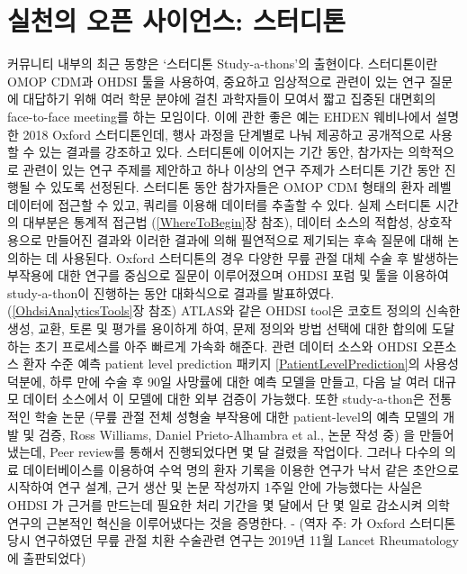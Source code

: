 \documentclass[10.5pt]{book}
\theoremstyle{definition}
\theoremstyle{definition}
\theoremstyle{definition}
\theoremstyle{remark}
\begin{document}
\section{실천의 오픈 사이언스: 스터디톤}\label{---}


커뮤니티 내부의 최근 동향은 `스터디톤 Study-a-thons'의 출현이다.
스터디톤이란 OMOP CDM과 OHDSI 툴을 사용하여, 중요하고 임상적으로 관련이
있는 연구 질문에 대답하기 위해 여러 학문 분야에 걸친 과학자들이 모여서
짧고 집중된 대면회의 face-to-face meeting를 하는 모임이다. 이에 관한
좋은 예는 EHDEN 웨비나에서 설명한 2018 Oxford 스터디톤인데, 행사 과정을
단계별로 나눠 제공하고 공개적으로 사용할 수 있는 결과를 강조하고 있다.
스터디톤에 이어지는 기간 동안, 참가자는 의학적으로 관련이 있는 연구
주제를 제안하고 하나 이상의 연구 주제가 스터디톤 기간 동안 진행될 수
있도록 선정된다. 스터디톤 동안 참가자들은 OMOP CDM 형태의 환자 레벨
데이터에 접근할 수 있고, 쿼리를 이용해 데이터를 추출할 수 있다. 실제
스터디톤 시간의 대부분은 통계적 접근법 (\ref{WhereToBegin}장 참조),
데이터 소스의 적합성, 상호작용으로 만들어진 결과와 이러한 결과에 의해
필연적으로 제기되는 후속 질문에 대해 논의하는 데 사용된다. Oxford
스터디톤의 경우 다양한 무릎 관절 대체 수술 후 발생하는 부작용에 대한
연구를 중심으로 질문이 이루어졌으며 OHDSI 포럼 및 툴을 이용하여
study-a-thon이 진행하는 동안 대화식으로 결과를 발표하였다.
(\ref{OhdsiAnalyticsTools}장 참조) ATLAS와 같은 OHDSI tool은 코호트
정의의 신속한 생성, 교환, 토론 및 평가를 용이하게 하여, 문제 정의와 방법
선택에 대한 합의에 도달하는 초기 프로세스를 아주 빠르게 가속화 해준다.
관련 데이터 소스와 OHDSI 오픈소스 환자 수준 예측 patient level
prediction 패키지 \ref{PatientLevelPrediction}의 사용성 덕분에, 하루
만에 수술 후 90일 사망률에 대한 예측 모델을 만들고, 다음 날 여러 대규모
데이터 소스에서 이 모델에 대한 외부 검증이 가능했다. 또한 study-a-thon은
전통적인 학술 논문 (무릎 관절 전체 성형술 부작용에 대한 patient-level의
예측 모델의 개발 및 검증, Ross Williams, Daniel Prieto-Alhambra et al.,
논문 작성 중) 을 만들어 냈는데, Peer review를 통해서 진행되었다면 몇 달
걸렸을 작업이다. 그러나 다수의 의료 데이터베이스를 이용하여 수억 명의
환자 기록을 이용한 연구가 낙서 같은 초안으로 시작하여 연구 설계, 근거
생산 및 논문 작성까지 1주일 안에 가능했다는 사실은 OHDSI 가 근거를
만드는데 필요한 처리 기간을 몇 달에서 단 몇 일로 감소시켜 의학 연구의
근본적인 혁신을 이루어냈다는 것을 증명한다. - (역자 주:
\citet{burn_opioid_2019} 가 Oxford 스터디톤 당시 연구하였던 무릎 관절
치환 수술관련 연구는 2019년 11월 Lancet Rheumatology에 출판되었다)
\end{document}
